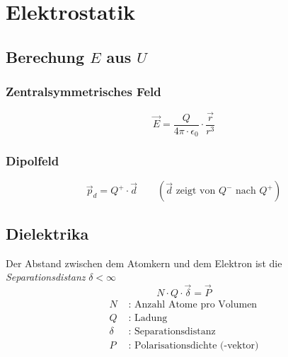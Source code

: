 \section{Elektrostatik}

\subsection{Berechung $E$ aus $U$}

\subsubsection{Zentralsymmetrisches Feld}
\begin{equation}
	\overrightarrow{E}=\frac{Q}{4\pi\cdot\epsilon_0}\cdot\frac{\overrightarrow{r}}{r^3}
\end{equation}

\subsubsection{Dipolfeld}
\begin{equation}
	\overrightarrow{p}_d=Q^{+}\cdot\overrightarrow{d}\qquad\left(\overrightarrow{d}\text{ zeigt von }Q^{-}\text{ nach }Q^{+}\right)
\end{equation}

\subsection{Dielektrika}
Der Abstand zwischen dem Atomkern und dem Elektron ist die {\em Separationsdistanz} $\delta < \infty$
\begin{equation}
	N\cdot Q\cdot\overrightarrow{\delta}=\overrightarrow{P}
\end{equation}
\begin{align*}
	N &\text{ : Anzahl Atome pro Volumen} \\
	Q &\text{ : Ladung} \\
	\delta &\text{ : Separationsdistanz} \\
	P &\text{ : Polarisationsdichte (-vektor)}
\end{align*}

